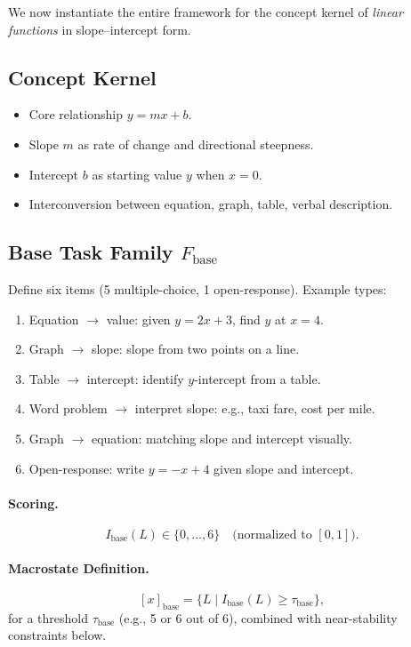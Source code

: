 \documentclass[11pt]{article}
\begin{document}
We now instantiate the entire framework for the concept kernel of \emph{linear functions} in slope–intercept form.

\subsection{Concept Kernel}

\begin{itemize}[itemsep=3pt]
  \item Core relationship $y = mx + b$.
  \item Slope $m$ as rate of change and directional steepness.
  \item Intercept $b$ as starting value $y$ when $x = 0$.
  \item Interconversion between equation, graph, table, verbal description.
\end{itemize}

\subsection{Base Task Family $F_{\text{base}}$}

Define six items (5 multiple-choice, 1 open-response). Example types:
\begin{enumerate}[itemsep=3pt]
  \item Equation $\to$ value: given $y = 2x + 3$, find $y$ at $x=4$.
  \item Graph $\to$ slope: slope from two points on a line.
  \item Table $\to$ intercept: identify $y$-intercept from a table.
  \item Word problem $\to$ interpret slope: e.g., taxi fare, cost per mile.
  \item Graph $\to$ equation: matching slope and intercept visually.
  \item Open-response: write $y = -x + 4$ given slope and intercept.
\end{enumerate}

\paragraph{Scoring.}
\[
I_{\text{base}}(L) \in \{0,\dots,6\} \quad \text{(normalized to } [0,1]).
\]

\paragraph{Macrostate Definition.}
\[
[x]_{\text{base}} = \{ L \mid I_{\text{base}}(L) \geq \tau_{\text{base}} \},
\]
for a threshold $\tau_{\text{base}}$ (e.g., 5 or 6 out of 6), combined with near-stability constraints below.
\end{document}
